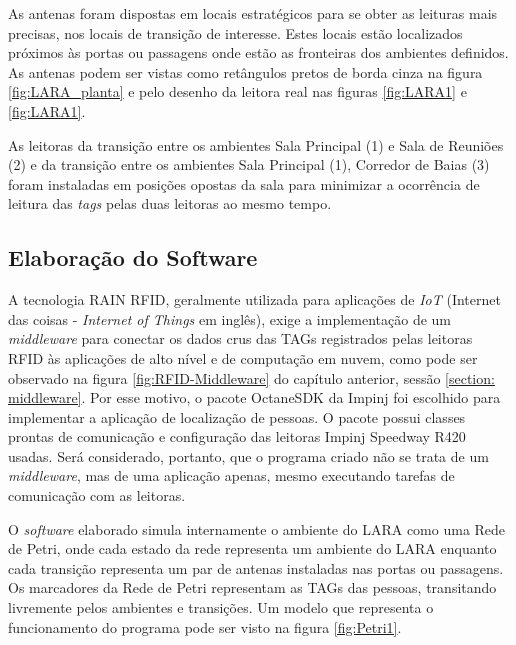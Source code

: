 As antenas foram dispostas em locais estratégicos para se obter as leituras mais precisas, nos locais de transição de interesse. Estes locais estão localizados próximos às portas ou passagens onde estão as fronteiras dos ambientes definidos. As antenas podem ser vistas como retângulos pretos de borda cinza na figura \ref{fig:LARA_planta} e pelo desenho da leitora real nas figuras \ref{fig:LARA1} e \ref{fig:LARA1}.

As leitoras da transição entre os ambientes Sala Principal (1) e Sala de Reuniões (2) e da transição entre os ambientes Sala Principal (1), Corredor de Baias (3) foram instaladas em posições opostas da sala para minimizar a ocorrência de leitura das \textit{tags} pelas duas leitoras ao mesmo tempo.

 \subsection{Elaboração do Software}
 
 A tecnologia RAIN RFID, geralmente utilizada para aplicações de \textit{IoT} (Internet das coisas - \textit{Internet of Things} em inglês), exige a implementação de um \textit{middleware} para conectar os dados crus das TAGs registrados pelas leitoras RFID às aplicações de alto nível e de computação em nuvem, como pode ser observado na figura \ref{fig:RFID-Middleware} do capítulo anterior, sessão \ref{section: middleware}. Por esse motivo, o pacote OctaneSDK da Impinj foi escolhido para implementar a aplicação de localização de pessoas. O pacote possui classes prontas de comunicação e configuração das leitoras Impinj Speedway R420 usadas. Será considerado, portanto, que o programa criado não se trata de um \textit{middleware}, mas de uma aplicação apenas, mesmo executando tarefas de comunicação com as leitoras.
 
 O \textit{software} elaborado simula internamente o ambiente do LARA como uma Rede de Petri, onde cada estado da rede representa um ambiente do LARA enquanto cada transição representa um par de antenas instaladas nas portas ou passagens. Os marcadores da Rede de Petri representam as TAGs das pessoas, transitando livremente pelos ambientes e transições. Um modelo que representa o funcionamento do programa pode ser visto na figura \ref{fig:Petri1}.
 
